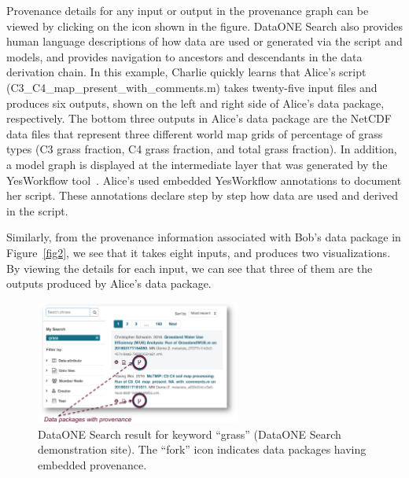 \documentclass[a4paper]{llncs}
\begin{document}
Provenance details for any input or output in the provenance graph can be viewed by clicking on the icon shown in the figure. DataONE Search also provides human language descriptions of how data are used or generated via the script and models, and provides navigation to ancestors and descendants in the data derivation chain. 
%
In this example, Charlie quickly learns that Alice's script (C3\_C4\_map\_present\_with\_comments.m) takes twenty-five input files and produces six outputs, shown on the left and right side of Alice's data package, respectively. The bottom three outputs in Alice's data package are the NetCDF data files that represent three different world map grids of percentage of grass types (C3 grass fraction, C4 grass fraction, and total grass fraction). In addition, a model graph is displayed at the intermediate layer that was generated by the YesWorkflow tool~\cite{yesworkflow}. Alice's used embedded YesWorkflow annotations to document her script. These annotations declare step by step how data are used and derived in the script. 

Similarly, from the provenance information associated with Bob's data package in Figure~\ref{fig2}, we see that it takes eight inputs, and produces two visualizations. By viewing the details for each input, we can see that three of them are the outputs produced by Alice's data package.  


\begin{figure}[t]
\centering   
\includegraphics[width=0.6\textwidth]{figs/ab-crop}
\caption{DataONE Search result for keyword  ``grass'' (DataONE Search demonstration site). The ``fork'' icon indicates data packages having embedded provenance.}
\label{fig1}
\end{figure}



%
%
\end{document}
